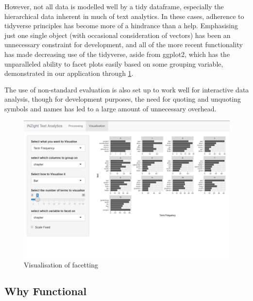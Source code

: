 \documentclass[11pt, a4paper, twoside, titlepage]{report}
\begin{document}
However, not all data is modelled well by a tidy dataframe, especially
the hierarchical data inherent in much of text analytics. In these
cases, adherence to tidyverse principles has become more of a
hindrance than a help. Emphasising just one single object (with
occasional consideration of vectors) has been an unnecessary
constraint for development, and all of the more recent functionality
has made decreasing use of the tidyverse, aside from ggplot2, which
has the unparalleled ability to facet plots easily based on some
grouping variable, demonstrated in our application through
\cref{fig:visualisation-facetting}.

The use of non-standard evaluation is also set up to work well for
interactive data analysis, though for development purposes, the need
for quoting and unquoting symbols and names has led to a large amount
of unnecessary overhead.

\begin{figure}
\centering
\includegraphics[scale=0.35]{visualisation-facetting.png}
\caption{Visualisation of facetting\label{fig:visualisation-facetting}}
\end{figure}

\subsection{Why Functional}\label{sec:why-functional}
\end{document}
